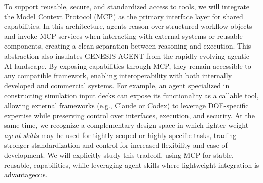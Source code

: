 \documentclass[11pt]{article} \usepackage[margin=1in]{geometry}
\begin{document}
To support reusable, secure, and standardized access to tools, we will integrate the Model Context Protocol (MCP) as the primary interface layer for shared capabilities. In this architecture, agents reason over structured workflow objects and invoke MCP services when interacting with external systems or reusable components, creating a clean separation between reasoning and execution. This abstraction also insulates GENESIS-AGENT from the rapidly evolving agentic AI landscape. By exposing capabilities through MCP, they remain accessible to any compatible framework, enabling interoperability with both internally developed and commercial systems. For example, an agent specialized in constructing simulation input decks can expose its functionality as a callable tool, allowing external frameworks (e.g., Claude or Codex) to leverage DOE-specific expertise while preserving control over interfaces, execution, and security.
At the same time, we recognize a complementary design space in which lighter-weight \emph{agent skills} may be used for tightly scoped or highly specific tasks, trading stronger standardization and control for increased flexibility and ease of development. We will explicitly study this tradeoff, using MCP for stable, reusable, capabilities, while leveraging agent skills where lightweight integration is advantageous.
\end{document}
